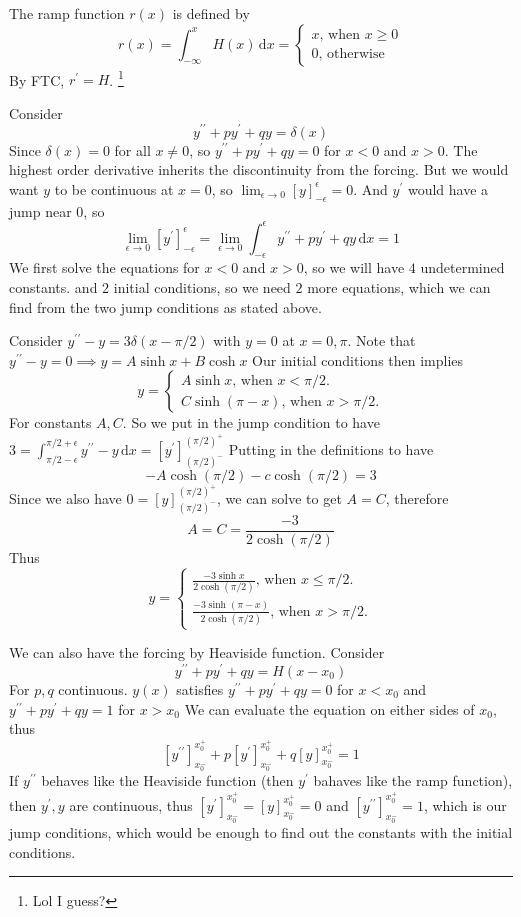 \begin{definition}
    The ramp function $r(x)$ is defined by
    $$r(x)=\int_{-\infty}^xH(x)\,\mathrm dx=
    \begin{cases}
        x\text{, when $x\ge 0$}\\
        0\text{, otherwise}
    \end{cases}$$
    By FTC, $r^\prime=H$.
    \footnote{Lol I guess?}
\end{definition}
Consider
$$y^{\prime\prime}+py^\prime+qy=\delta(x)$$
Since $\delta(x)=0$ for all $x\neq 0$, so $y^{\prime\prime}+py^\prime+qy=0$ for $x<0$ and $x>0$.
The highest order derivative inherits the discontinuity from the forcing.
But we would want $y$ to be continuous at $x=0$, so $\lim_{\epsilon\to 0}[y]^{\epsilon}_{-\epsilon}=0$.
And $y^\prime$ would have a jump near $0$, so
$$\lim_{\epsilon\to 0}[y^\prime]^\epsilon_{-\epsilon}=\lim_{\epsilon\to 0}\int_{-\epsilon}^\epsilon y^{\prime\prime}+py^\prime+qy\,\mathrm dx=1$$
We first solve the equations for $x<0$ and $x>0$, so we will have $4$ undetermined constants. and $2$ initial conditions, so we need $2$ more equations, which we can find from the two jump conditions as stated above.
\begin{example}
    Consider $y^{\prime\prime}-y=3\delta(x-\pi/2)$
    with $y=0$ at $x=0,\pi$.
    Note that $y^{\prime\prime}-y=0\implies y=A\sinh x+B\cosh x$
    Our initial conditions then implies
    $$y=
    \begin{cases}
        A\sinh x\text{, when $x<\pi/2$.}\\
        C\sinh (\pi-x)\text{, when $x>\pi/2$.}
    \end{cases}$$
    For constants $A,C$.
    So we put in the jump condition to have
    $3=\int_{\pi/2-\epsilon}^{\pi/2+\epsilon}y^{\prime\prime}-y\,\mathrm dx=[y^\prime]^{(\pi/2)^+}_{(\pi/2)^-}$
    Putting in the definitions to have
    $$-A\cosh(\pi/2)-c\cosh(\pi/2)=3$$
    Since we also have $0=[y]^{(\pi/2)^+}_{(\pi/2)^-}$, we can solve to get $A=C$, therefore
    $$A=C=\frac{-3}{2\cosh(\pi/2)}$$
    Thus
    $$y=
    \begin{cases}
        \frac{-3\sinh x}{2\cosh(\pi/2)}\text{, when $x\le\pi/2$.}\\
        \frac{-3\sinh (\pi-x)}{2\cosh(\pi/2)}\text{, when $x>\pi/2$.}
    \end{cases}$$
\end{example}
We can also have the forcing by Heaviside function.
Consider
$$y^{\prime\prime}+py^\prime+qy=H(x-x_0)$$
For $p,q$ continuous.
$y(x)$ satisfies $y^{\prime\prime}+py^\prime+qy=0$ for $x<x_0$ and $y^{\prime\prime}+py^\prime+qy=1$ for $x>x_0$
We can evaluate the equation on either sides of $x_0$, thus
$$[y^{\prime\prime}]^{x_0^+}_{x_0^-}+p[y^{\prime}]^{x_0^+}_{x_0^-}+q[y]^{x_0^+}_{x_0^-}=1$$
If $y^{\prime\prime}$ behaves like the Heaviside function (then $y^\prime$ bahaves like the ramp function), then $y^\prime,y$ are continuous, thus $[y^{\prime}]^{x_0^+}_{x_0^-}=[y]^{x_0^+}_{x_0^-}=0$ and $[y^{\prime\prime}]^{x_0^+}_{x_0^-}=1$, which is our jump conditions, which would be enough to find out the constants with the initial conditions.
